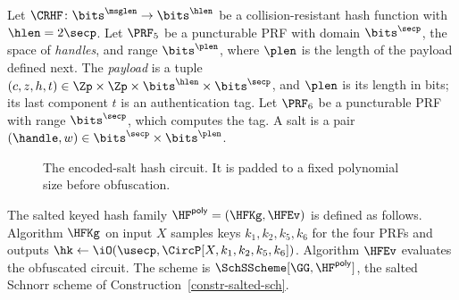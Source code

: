 Let $\CRHF \colon \bits^{\msglen} \to \bits^{\hlen}$ be a collision-resistant hash function with $\hlen = 2\secp$. Let $\PRF_5$ be a puncturable PRF with domain $\bits^{\secp}$, the space of \emph{handles}, and range $\bits^{\plen}$, where $\plen$ is the length of the payload defined next. The \emph{payload} is a tuple $(c, z, h, t) \in \Zp \times \Zp \times \bits^{\hlen} \times \bits^{\secp}$, and $\plen$ is its length in bits; its last component $t$ is an authentication tag. Let $\PRF_6$ be a puncturable PRF with range $\bits^{\secp}$, which computes the tag. A salt is a pair $(\handle, w) \in \bits^{\secp} \times \bits^{\plen}$.

\begin{figure}[t]
\begin{center}
\end{center}
\vspace{-6pt}
\caption{The encoded-salt hash circuit. It is padded to a fixed polynomial size before obfuscation.}\label{fig-circuit-poly}
\vspace{-3pt}\hrulefill
\vspace{-1ex}
\end{figure}

\begin{construction} \label{constr-poly}
The salted keyed hash family $\HF^{\mathsf{poly}} = (\HFKg, \HFEv)$ is defined as follows. Algorithm $\HFKg$ on input $X$ samples keys $k_1, k_2, k_5, k_6$ for the four PRFs and outputs $\hk \gets \iO(\usecp, \CircP[X, k_1, k_2, k_5, k_6])$. Algorithm $\HFEv$ evaluates the obfuscated circuit. The scheme is $\SchSScheme[\GG, \HF^{\mathsf{poly}}]$, the salted Schnorr scheme of Construction~\ref{constr-salted-sch}.
\end{construction}

